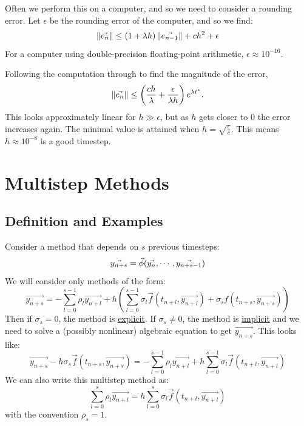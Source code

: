 \documentclass[../Main.tex]{subfiles}
\begin{document}
Often we perform this on a computer, and so we need to consider a rounding error. Let $\epsilon$ be the rounding error of the computer, and so we find:
\begin{equation*}
    \left\|\vec{e_n}\right\| \leq (1 + \lambda h) \left\|\vec{e_{n-1}}\right\| + ch^2 + \epsilon
\end{equation*}
For a computer using double-precision floating-point arithmetic, $\epsilon \approx 10^{-16}$.

Following the computation through to find the magnitude of the error,
\begin{equation*}
    \left\|\vec{e_n}\right\| \leq \left(\frac{ch}{\lambda} + \frac{\epsilon}{\lambda h}\right)e^{\lambda t^\star}.
\end{equation*}
This looks approximately linear for $h \gg \epsilon$, but as $h$ gets closer to $0$ the error increases again. The minimal value is attained when $h = \sqrt{\frac{\epsilon}{c}}$. This means $h \approx 10^{-8}$ is a good timestep.
\section{Multistep Methods}
\subsection{Definition and Examples}
Consider a method that depends on $s$ previous timesteps:
\begin{equation*}
    \vec{y_{n+s}} = \vec{\phi}(\vec{y_n}, \cdots, \vec{y_{n+s-1}}) \\
\end{equation*}
We will consider only methods of the form:
\begin{equation*}
    \vec{y_{n + s}} = -\sum_{l = 0}^{s-1} \rho_l \vec{y_{n + l}} + h\left(\sum_{l = 0}^{s-1} \sigma_l \vec{f}(t_{n+l}, \vec{y_{n+l}}) + \sigma_s f(t_{n+s}, \vec{y_{n+s}})\right)
\end{equation*}
Then if $\sigma_s = 0$, the method is \underline{explicit}. If $\sigma_s \neq 0$, the method is \underline{implicit} and we need to solve a (possibly nonlinear) algebraic equation to get $\vec{y_{n+s}}$. This looks like:
\begin{equation*}
    \vec{y_{n+s}} - h \sigma_s \vec{f}(t_{n + s}, \vec{y_{n + s}}) = -\sum_{l=0}^{s-1} \rho_l \vec{y_{n + l}} + h \sum_{l = 0}^{s - 1}\sigma_l \vec{f}(t_{n + l}, \vec{y_{n + l}})
\end{equation*}
We can also write this multistep method as:
\begin{equation}
    \sum_{l=0}^{s} \rho_l \vec{y_{n + l}} = h\sum_{l=0}^{s} \sigma_l \vec{f}(t_{n + l}, \vec{y_{n + l}})
    \label{eqnMultiStep}
\end{equation}
with the convention $\rho_s = 1$.
\end{document}
